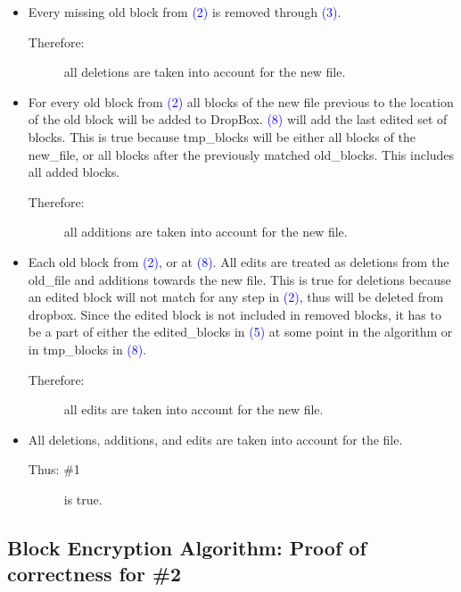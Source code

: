 \documentclass[11pt]{article}
\newcommand{\blue}[1]{\textcolor{blue}{#1}}
\begin{document}
\begin{itemize}
\item Every missing old block from \blue{(2)} is removed through \blue{(3)}. 

\begin{description} 
\item[Therefore:] all deletions are taken into account for the new file.
\end{description}

\item For every old block from \blue{(2)} all blocks of the new file previous to the location of the old block will be added to DropBox. \blue{(8)} will add the last edited set of blocks. This is true because tmp\_blocks will be either all blocks of the new\_file, or all blocks after the previously matched old\_blocks. This includes all added blocks. 

\begin{description}
\item[Therefore:] all additions are taken into account for the new file.
\end{description}

\item Each old block from \blue{(2)}, or at \blue{(8)}. All edits are treated as deletions from the old\_file and additions towards the new file. This is true for deletions because an edited block will not match for any step in \blue{(2)}, thus will be deleted from dropbox. Since the edited block is not included in removed blocks, it has to be a part of either the edited\_blocks in \blue{(5)} at some point in the algorithm or in tmp\_blocks in \blue{(8)}. 

\begin{description}
\item[Therefore:] all edits are taken into account for the new file.
\end{description}

\item All deletions, additions, and edits are taken into account for the file. 

\begin{description}
\item[Thus: \#1] is true.
\end{description}

\end{itemize}

\subsection{Block Encryption Algorithm: Proof of correctness for \#2}
\end{document}

